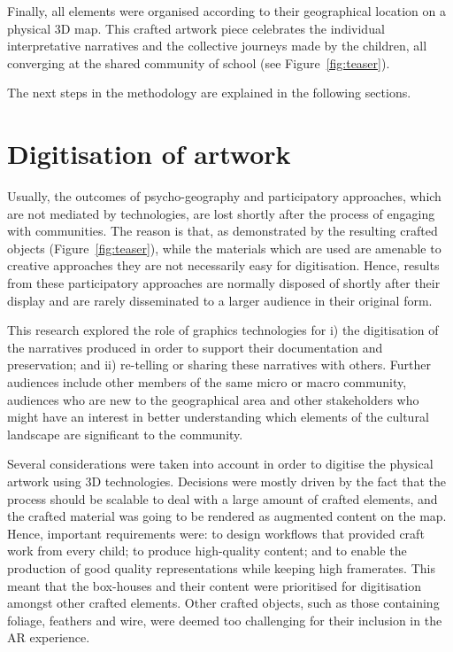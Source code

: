 \documentclass[acmlarge,screen,dvipsnames]{acmart}
\begin{document}
Finally, all elements were organised according to their geographical location
on a physical 3D map. This crafted artwork piece celebrates the individual
interpretative narratives and the collective journeys made by the children, all
converging at the shared community of school (see Figure~\ref{fig:teaser}). 


The next steps in the methodology are explained in the following sections.

\section{Digitisation of artwork} 
\label{dig} 
Usually, the
outcomes of psycho-geography and participatory approaches, which are not
mediated by technologies, are lost shortly after the process of engaging with
communities. The reason is that, as demonstrated by the resulting crafted
objects (Figure~\ref{fig:teaser}), while the materials which are used  are
amenable to creative approaches they are not necessarily easy for
digitisation. Hence, results from these participatory approaches are normally
disposed of shortly after their display and are rarely disseminated to
 a larger audience in their original form. 

This research explored the role of graphics technologies for i) the
digitisation of the narratives produced in order to support their
documentation and preservation; and ii) re-telling or sharing these narratives with others.
Further audiences include other members of the same micro or macro community, audiences who are
new to the geographical area and other stakeholders who might have an interest
in better understanding which elements of the cultural landscape are
significant to the community.

Several considerations were taken into  account in order to digitise the
physical artwork using 3D technologies. Decisions were mostly driven by
the fact that the process should be scalable to deal with a large amount of
crafted elements, and the crafted material was going to be rendered
as augmented content on the map. Hence, important requirements were: to
design workflows that provided craft work from every child; to produce
high-quality content; and to enable the production of good quality
representations while keeping high framerates. This meant that
the box-houses and their content were prioritised for digitisation
amongst other crafted elements. Other crafted objects, such as those
containing foliage, feathers and wire, were deemed too challenging  for
their inclusion in the AR experience.
\end{document}
